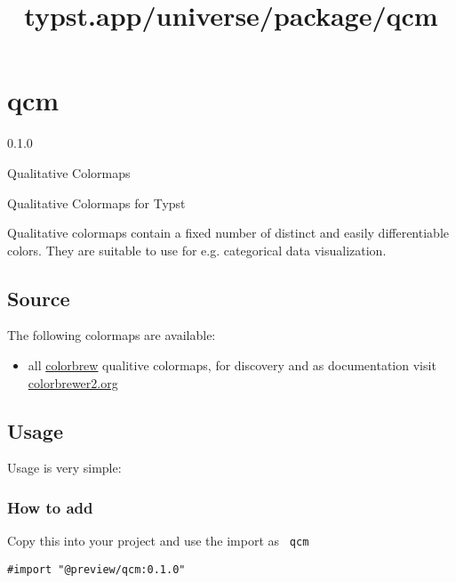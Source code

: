 \title{typst.app/universe/package/qcm}

\label{banner}
\section{qcm}\label{qcm}

{ 0.1.0 }

Qualitative Colormaps

\label{readme}
Qualitative Colormaps for Typst

Qualitative colormaps contain a fixed number of distinct and easily
differentiable colors. They are suitable to use for e.g. categorical
data visualization.

\subsection{Source}\label{source}

The following colormaps are available:

\begin{itemize}
\tightlist
\item
  all \href{https://github.com/axismaps/colorbrewer/}{colorbrew}
  qualitive colormaps, for discovery and as documentation visit
  \href{https://colorbrewer2.org/}{colorbrewer2.org}
\end{itemize}

\subsection{Usage}\label{usage}

Usage is very simple:

\begin{Shaded}
\begin{Highlighting}[]

\end{Highlighting}
\end{Shaded}

\subsubsection{How to add}\label{how-to-add}

Copy this into your project and use the import as \texttt{\ qcm\ }

\begin{verbatim}
#import "@preview/qcm:0.1.0"
\end{verbatim}

